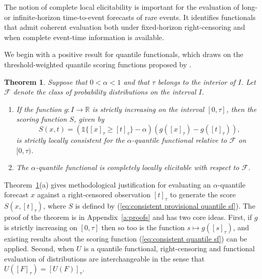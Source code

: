 \documentclass[10pt]{article} %
\theoremstyle{theorem}
\newtheorem{thm}{Theorem}
\theoremstyle{definition}
\newcommand{\RRR}{\mathbb{R}}
\newcommand{\one}{\mathds{1}}
\begin{document}
The notion of complete local elicitability is important for the evaluation of long- or infinite-horizon time-to-event forecasts of rare events. It identifies functionals that admit coherent evaluation both under fixed-horizon right-censoring and when complete event-time information is available.

We begin with a positive result for quantile functionals, which draws on the threshold-weighted quantile scoring functions proposed by \citet{taggart2022evaluation}.

\begin{thm}\label{thm:quantile is provisionally elicitable}
Suppose that $0<\alpha<1$ and that $\tau$ belongs to the interior of $I$. Let $\mathcal{F}$ denote the class of probability distributions on the interval $I$.
\begin{enumerate}
\item[(a)] If the function $g:I\to\RRR$ is strictly increasing on the interval $[0,\tau]$, then the scoring function $S$, given by
\begin{equation}\label{eq:consistent provisional quantile sf}
S(x,t) = (\one\{[x]_\tau\geq [t]_\tau\} - \alpha)(g([x]_\tau)-g([t]_\tau)),
\end{equation}
is strictly locally consistent for the $\alpha$-quantile functional relative to $\mathcal{F}$ on $[0,\tau)$.
\item[(b)] The $\alpha$-quantile functional is completely locally elicitable with respect to $\mathcal{F}$.
\end{enumerate}
\end{thm}

Theorem~\ref{thm:quantile is provisionally elicitable}(a) gives methodological justification for evaluating an $\alpha$-quantile forecast $x$ against a right-censored observation $[t]_\tau$ to generate the score $S(x,[t]_\tau)$, where $S$ is defined by (\ref{eq:consistent provisional quantile sf}). The proof of the theorem is in Appendix~\ref{a:proofs} and has two core ideas. First, if $g$ is strictly increasing on $[0,\tau]$ then so too is the function $s\mapsto g([s]_\tau)$, and existing results about the scoring function (\ref{eq:consistent quantile sf}) can be applied. Second, when $U$ is a quantile functional, right-censoring and functional evaluation of distributions are interchangeable in the sense that $U([F]_\tau)=[U(F)]_\tau$.
\end{document}
